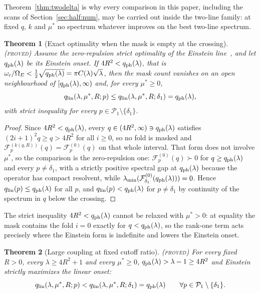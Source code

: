 \documentclass[11pt]{article}
\newcommand{\OmE}{\Omega_E}
\newcommand{\Fcal}{\mathcal F}
\newcommand{\muS}{\mu^{*}}
\newtheorem{theorem}{Theorem}[section]
\theoremstyle{definition}
\theoremstyle{remark}
\newcommand{\proved}{\textnormal{\textsc{(proved)}}}
\begin{document}
Theorem~\ref{thm:twodelta} is why every comparison in this paper, including the scans of
Section~\ref{sec:half:num}, may be carried out inside the two-line family: at fixed $q$,
$k$ and $\muS$ no spectrum whatever improves on the best two-line spectrum.

\begin{theorem}[Exact optimality when the mask is empty at the crossing]
\label{thm:nomask}\proved
Assume the zero-repulsion strict optimality of the Einstein line~\cite{rens,kondratev}, and
let $q_{\rm ph}(\lambda)$ be its Einstein onset. If $4R^2<q_{\rm ph}(\lambda)$, that is
$\omega_c/\OmE<\tfrac12\sqrt{q_{\rm ph}(\lambda)}=\pi C(\lambda)\sqrt\lambda$, then the
mask count vanishes on an open neighbourhood of $[q_{\rm ph}(\lambda),\infty)$ and, for
every $\muS\ge0$,
\[
q_{\rm lin}(\lambda,\muS,R;p)\le q_{\rm lin}(\lambda,\muS,R;\delta_1)
=q_{\rm ph}(\lambda),
\]
with strict inequality for every $p\in\mathcal P_1\setminus\{\delta_1\}$.
\end{theorem}

\begin{proof}
Since $4R^2<q_{\rm ph}(\lambda)$, every $q\in(4R^2,\infty)\ni q_{\rm ph}(\lambda)$
satisfies $(2i+1)^2q\ge q>4R^2$ for all $i\ge0$, so no fold is masked and
$\Fcal_p^{(k(q,R))}(q)=\Fcal_p^{(0)}(q)$ on that whole interval. That form does not involve
$\muS$, so the comparison is the zero-repulsion one: $\Fcal_p^{(0)}(q)\succ0$ for
$q\ge q_{\rm ph}(\lambda)$ and every $p\ne\delta_1$, with a strictly positive spectral gap
at $q_{\rm ph}(\lambda)$ because the operator has compact resolvent, while
$\lambda_{\min}(\Fcal_{\delta_1}^{(0)}(q_{\rm ph}(\lambda)))=0$. Hence
$q_{\rm lin}(p)\le q_{\rm ph}(\lambda)$ for all $p$, and $q_{\rm lin}(p)<q_{\rm ph}(\lambda)$
for $p\ne\delta_1$ by continuity of the spectrum in $q$ below the crossing.
\end{proof}

The strict inequality $4R^2<q_{\rm ph}(\lambda)$ cannot be relaxed with $\muS>0$: at
equality the mask contains the fold $i=0$ exactly for $q<q_{\rm ph}(\lambda)$, so the
rank-one term acts precisely where the Einstein form is indefinite and lowers the
Einstein onset.

\begin{theorem}[Large coupling at fixed cutoff ratio]\label{thm:large}\proved
For every fixed $R>0$, every $\lambda\ge4R^2+1$ and every $\muS\ge0$,
$q_{\rm ph}(\lambda)>\lambda-1\ge4R^2$ and Einstein strictly maximizes the linear onset:
\[
q_{\rm lin}(\lambda,\muS,R;p)<q_{\rm lin}(\lambda,\muS,R;\delta_1)=q_{\rm ph}(\lambda)
\qquad\forall p\in\mathcal P_1\setminus\{\delta_1\}.
\]
\end{theorem}
\end{document}
